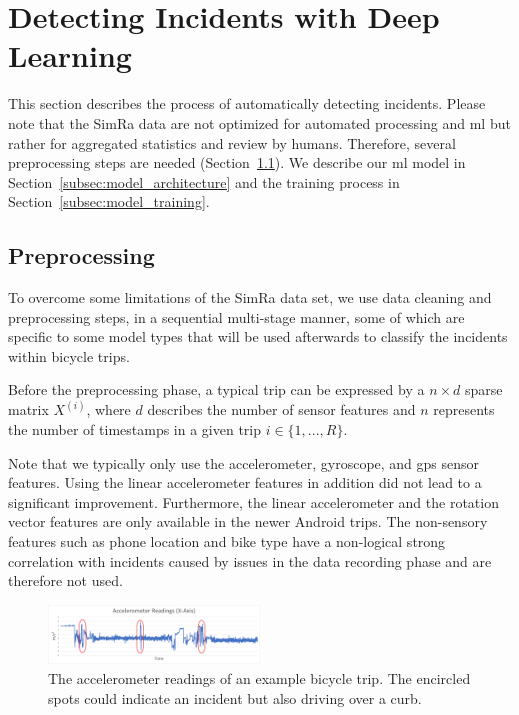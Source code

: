 \section{Detecting Incidents with Deep Learning}
\label{sec:detecting_near_miss_incidents}
This section describes the process of automatically detecting incidents. 
Please note that the SimRa data are not optimized for automated processing and \ac{ml} but rather for aggregated statistics and review by humans.
Therefore, several preprocessing steps are needed (Section~\ref{subsec:preprocessing}).
We describe our \ac{ml} model in Section~\ref{subsec:model_architecture} and the training process in Section~\ref{subsec:model_training}.


\subsection{Preprocessing}
\label{subsec:preprocessing}
To overcome some limitations of the SimRa data set, we use data cleaning and preprocessing steps, in a sequential multi-stage manner, some of which are specific to some model types that will be used afterwards to classify the incidents within bicycle trips.

Before the preprocessing phase, a typical trip can be expressed by a $n \times d$ sparse matrix $X^{(i)}$, where $d$ describes the number of sensor features and $n$ represents the number of timestamps in a given trip $i \in \{1,...,R\}$.

Note that we typically only use the accelerometer, gyroscope, and \ac{gps} sensor features.
Using the linear accelerometer features in addition did not lead to a significant improvement.
Furthermore, the linear accelerometer and the rotation vector features are only available in the newer Android trips.
The non-sensory features such as phone location and bike type have a non-logical strong correlation with incidents caused by issues in the data recording phase and are therefore not used.

\begin{figure}[t]
	\centering
	\includegraphics[width=0.5\textwidth]{fig/accelerometer-x-axis.png}
	\caption{The accelerometer readings of an example bicycle trip. The encircled spots could indicate an incident but also driving over a curb.}
	\label{fig:x-axis}
\end{figure}

